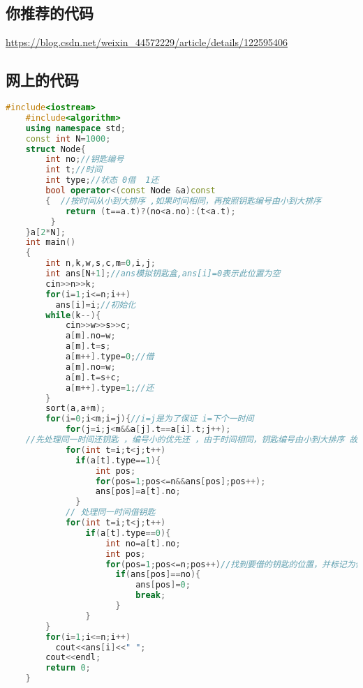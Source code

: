 \subsection{你推荐的代码}

\href{201709-2 公共钥匙盒}{https://blog.csdn.net/weixin\_44572229/article/details/122595406}

\subsection{网上的代码}
\begin{lstlisting}[language=C++]
    #include<iostream>
    #include<algorithm>
    using namespace std;
    const int N=1000;
    struct Node{
        int no;//钥匙编号
        int t;//时间
        int type;//状态 0借  1还
        bool operator<(const Node &a)const 
        {  //按时间从小到大排序 ,如果时间相同，再按照钥匙编号由小到大排序 
            return (t==a.t)?(no<a.no):(t<a.t);
         } 
    }a[2*N];
    int main()
    {
        int n,k,w,s,c,m=0,i,j;
        int ans[N+1];//ans模拟钥匙盒,ans[i]=0表示此位置为空 
        cin>>n>>k;
        for(i=1;i<=n;i++)
          ans[i]=i;//初始化 
        while(k--){
            cin>>w>>s>>c;
            a[m].no=w;
            a[m].t=s;
            a[m++].type=0;//借
            a[m].no=w;
            a[m].t=s+c;
            a[m++].type=1;//还 
        }
        sort(a,a+m);
        for(i=0;i<m;i=j){//i=j是为了保证 i=下个一时间 
            for(j=i;j<m&&a[j].t==a[i].t;j++);
    //先处理同一时间还钥匙 ，编号小的优先还 ，由于时间相同，钥匙编号由小到大排序 故顺序处理即可 
            for(int t=i;t<j;t++)
              if(a[t].type==1){
                  int pos;
                  for(pos=1;pos<=n&&ans[pos];pos++);
                  ans[pos]=a[t].no;
              } 
            // 处理同一时间借钥匙 
            for(int t=i;t<j;t++)
                if(a[t].type==0){
                    int no=a[t].no;
                    int pos;
                    for(pos=1;pos<=n;pos++)//找到要借的钥匙的位置，并标记为借走 
                      if(ans[pos]==no){
                          ans[pos]=0;
                          break;
                      }
                }
        }
        for(i=1;i<=n;i++)
          cout<<ans[i]<<" ";
        cout<<endl;
        return 0; 
    }
\end{lstlisting}